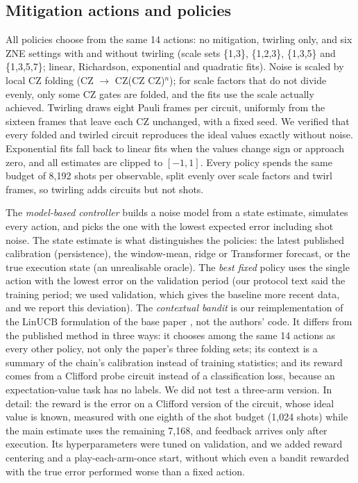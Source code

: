 \documentclass[conference]{IEEEtran}
\begin{document}
\subsection{Mitigation actions and policies}
All policies choose from the same 14 actions: no mitigation, twirling only, and six ZNE settings with and without twirling (scale sets \{1,3\}, \{1,2,3\}, \{1,3,5\} and \{1,3,5,7\}; linear, Richardson, exponential and quadratic fits). Noise is scaled by local CZ folding (CZ $\rightarrow$ CZ(CZ CZ)$^n$); for scale factors that do not divide evenly, only some CZ gates are folded, and the fits use the scale actually achieved. Twirling draws eight Pauli frames per circuit, uniformly from the sixteen frames that leave each CZ unchanged, with a fixed seed. We verified that every folded and twirled circuit reproduces the ideal values exactly without noise. Exponential fits fall back to linear fits when the values change sign or approach zero, and all estimates are clipped to $[-1,1]$. Every policy spends the same budget of 8,192 shots per observable, split evenly over scale factors and twirl frames, so twirling adds circuits but not shots.

The \textit{model-based controller} builds a noise model from a state estimate, simulates every action, and picks the one with the lowest expected error including shot noise. The state estimate is what distinguishes the policies: the latest published calibration (persistence), the window-mean, ridge or Transformer forecast, or the true execution state (an unrealisable oracle). The \textit{best fixed} policy uses the single action with the lowest error on the validation period (our protocol text said the training period; we used validation, which gives the baseline more recent data, and we report this deviation). The \textit{contextual bandit} is our reimplementation of the LinUCB formulation of the base paper \cite{rahman2026}, not the authors' code. It differs from the published method in three ways: it chooses among the same 14 actions as every other policy, not only the paper's three folding sets; its context is a summary of the chain's calibration instead of training statistics; and its reward comes from a Clifford probe circuit instead of a classification loss, because an expectation-value task has no labels. We did not test a three-arm version. In detail: the reward is the error on a Clifford version of the circuit, whose ideal value is known, measured with one eighth of the shot budget (1,024 shots) while the main estimate uses the remaining 7,168, and feedback arrives only after execution. Its hyperparameters were tuned on validation, and we added reward centering and a play-each-arm-once start, without which even a bandit rewarded with the true error performed worse than a fixed action.
\end{document}
